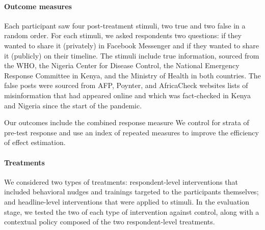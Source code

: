 \documentclass[letterpaper, 12pt, parskip=full,DIV=10]{scrartcl}
\begin{document}
\paragraph{Outcome measures}\label{section:measures}
Each participant saw four post-treatment stimuli, two true and two false in a random order. For each stimuli, we asked respondents two questions: if they wanted to share it (privately) in Facebook Messenger and if they wanted to share it (publicly) on their timeline. 
The stimuli include true information, sourced from the WHO, the Nigeria Center for Disease Control, the National Emergency Response Committee in Kenya, and the Ministry of Health in both countries. The false posts were sourced from AFP, Poynter, and AfricaCheck websites lists of misinformation that had appeared online and which was fact-checked in Kenya and Nigeria since the start of the pandemic. 

Our outcomes include the combined response measure
We control for strata of pre-test response \citep{davidian2005semiparametric} and use an index of repeated measures \citep{broockman2017design} to improve the efficiency of effect estimation. 


\paragraph{Treatments}\label{section:treatments}

We considered two types of treatments: respondent-level interventions that included behavioral nudges and trainings targeted to the participants themselves; and headline-level interventions that were applied to stimuli. In the evaluation stage, we tested the two of each type of intervention against control, along with a contextual policy composed of the two respondent-level treatments. 
\end{document}
